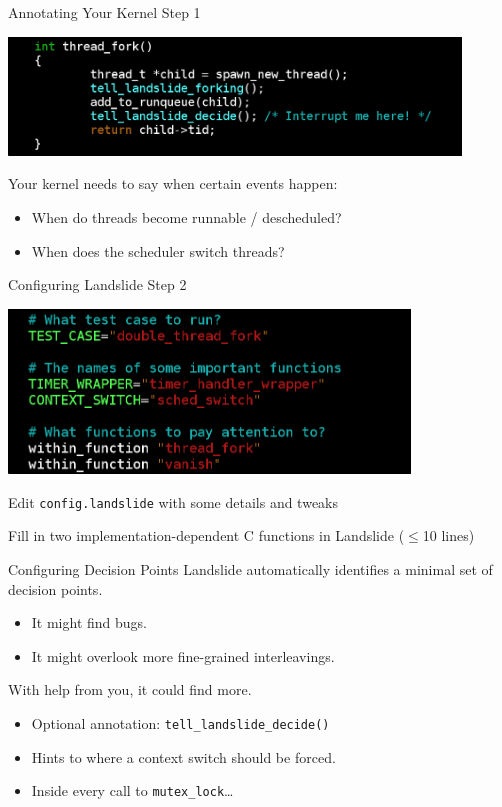 \documentclass[xcolor=dvipsnames]{beamer}
\begin{document}
\begin{frame}{Annotating Your Kernel}
	Step 1
	\begin{center}
		\includegraphics[width=0.9\textwidth]{tell_landslide.png}
	\end{center}
	Your kernel needs to say when certain events happen:
	\begin{itemize}
		\item When do threads become runnable / descheduled?
		\item When does the scheduler switch threads?
	\end{itemize}
	\linegap

\end{frame}

\begin{frame}{Configuring Landslide}
	Step 2
	\begin{center}
		\includegraphics[width=0.8\textwidth]{config-landslide.png}
	\end{center}
	Edit \texttt{config.landslide} with some details and tweaks

	Fill in two implementation-dependent C functions in Landslide ($\le$10 lines)
	\linegap

\end{frame}

\begin{frame}{Configuring Decision Points}
	Landslide automatically identifies a minimal set of decision points.
	\begin{itemize}
		\item It might find bugs.
		\item It might overlook more fine-grained interleavings.
	\end{itemize}
	With help from you, it could find more.
	\begin{itemize}
		\item Optional annotation: \texttt{tell\_landslide\_decide()}
		\item Hints to where a context switch should be forced.
		\item Inside every call to \texttt{mutex\_lock}\ldots
	\end{itemize}
\end{frame}
\end{document}
